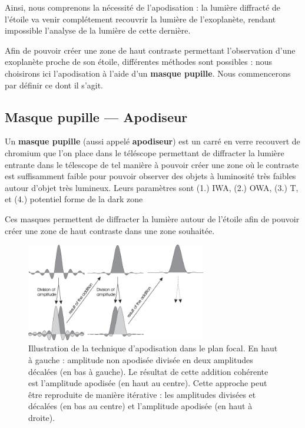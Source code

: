 Ainsi, nous comprenons la nécessité de l'apodisation : la lumière diffracté de l'étoile va venir complétement recouvrir la lumière de l'exoplanète, rendant impossible l'analyse de la lumière de cette dernière. 

Afin de pouvoir créer une zone de haut contraste permettant l'observation d'une exoplanète proche de son étoile, différentes méthodes sont possibles : nous choisirons ici l’apodisation à l’aide d’un \textbf{masque pupille}. Nous commencerons par définir ce dont il s'agit.

\subsection{Masque pupille — Apodiseur}

Un \textbf{masque pupille} (aussi appelé \textbf{apodiseur}) est un carré en verre recouvert de chromium que l'on place dans le téléscope permettant de diffracter la lumière entrante dans le télescope de tel manière à pouvoir créer une zone où le contraste est suffisamment faible pour pouvoir observer des objets à luminosité très faibles autour d'objet très lumineux.  Leurs paramètres sont (1.) IWA, (2.) OWA, (3.) T, et (4.) potentiel forme de la dark zone

Ces masques permettent de diffracter la lumière autour de l’étoile afin de pouvoir créer une zone de haut contraste dans une zone souhaitée.


\begin{figure}[htbp]
    \centering
    \includegraphics[width=0.7\textwidth]{figures/apod_explanation.png}
    \caption{Illustration de la technique d'apodisation dans le plan focal. En haut à gauche : amplitude non apodisée divisée en deux amplitudes décalées (en bas à gauche). Le résultat de cette addition cohérente est l'amplitude apodisée (en haut au centre). Cette approche peut être reproduite de manière itérative : les amplitudes divisées et décalées (en bas au centre) et l'amplitude apodisée (en haut à droite). }%
\end{figure}

